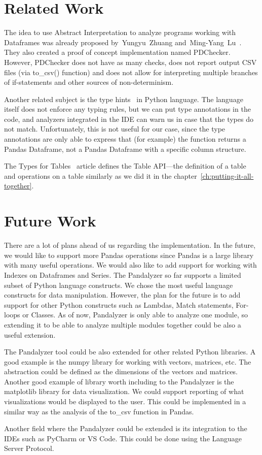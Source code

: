 \section*{Related Work}

The idea to use Abstract Interpretation to analyze programs working with Dataframes was already proposed by~Yungyu~Zhuang
and~Ming-Yang~Lu~\cite{Zhuang:2022:TypeChecking}.
They also created a proof of concept implementation named PDChecker.
However, PDChecker does not have as many checks, does not report output CSV files (via to\_csv() function) and
does not allow for interpreting multiple branches of if-statements and other sources of non-determinism.

Another related subject is the type hints~\cite{python_typing} in Python language.
The language itself does not enforce any typing rules, but we can put type annotations in the code, and analyzers
integrated in the IDE can warn us in case that the types do not match.
Unfortunately, this is not useful for our case, since the type annotations are only able to express that
(for example) the function returns a Pandas Dataframe, not a Pandas Dataframe with a specific column structure.

The Types for Tables~\cite{types_for_tables} article defines the Table API---the definition of a table and operations on
a table similarly as we did it in the chapter~\ref{ch:putting-it-all-together}.


\section*{Future Work}\label{sec:future-work}

There are a lot of plans ahead of us regarding the implementation.
In the future, we would like to support more Pandas operations since Pandas is a large library with many useful
operations.
We would also like to add support for working with Indexes on Dataframes and Series.
The Pandalyzer so far supports a limited subset of Python language constructs.
We chose the most useful language constructs for data manipulation.
However, the plan for the future is to add support for other Python constructs such as Lambdas, Match statements,
For-loops or Classes.
As of now, Pandalyzer is only able to analyze one module, so extending it to be able to analyze multiple modules together
could be also a useful extension.

The Pandalyzer tool could be also extended for other related Python libraries.
A good example is the numpy library for working with vectors, matrices, etc.
The abstraction could be defined as the dimensions of the vectors and matrices.
Another good example of library worth including to the Pandalyzer is the matplotlib library for data visualization.
We could support reporting of what visualizations would be displayed to the user.
This could be implemented in a similar way as the analysis of the to\_csv function in Pandas.

Another field where the Pandalyzer could be extended is its integration to the IDEs such as PyCharm or VS Code.
This could be done using the Language Server Protocol.